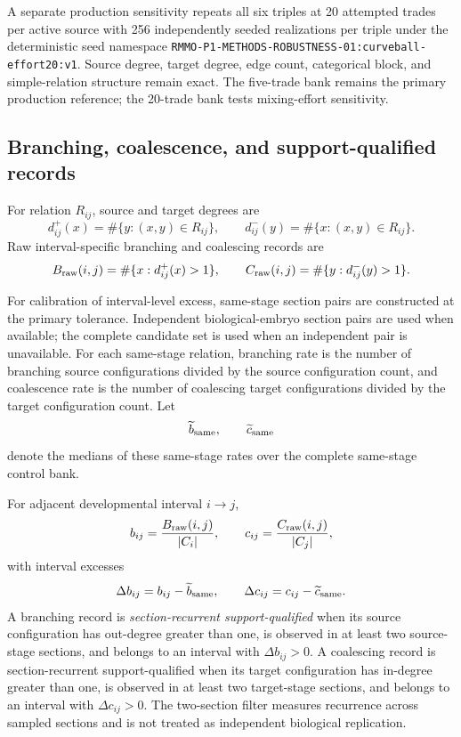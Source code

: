 \documentclass[11pt]{article}
\begin{document}
A separate production sensitivity repeats all six triples at 20 attempted trades per active source with 256 independently seeded realizations per triple under the deterministic seed namespace \texttt{RMMO-P1-METHODS-ROBUSTNESS-01:}\allowbreak\texttt{curveball-effort20:v1}. Source degree, target degree, edge count, categorical block, and simple-relation structure remain exact. The five-trade bank remains the primary production reference; the 20-trade bank tests mixing-effort sensitivity.

\subsection{Branching, coalescence, and support-qualified records}

For relation \(R_{ij}\), source and target degrees are
\[
d_{ij}^{+}(x)
=
\#\{y:(x,y)\in R_{ij}\},
\qquad
d_{ij}^{-}(y)
=
\#\{x:(x,y)\in R_{ij}\}.
\]
Raw interval-specific branching and coalescing records are
\begin{equation}
B_{\rm raw}(i,j)
=
\#\{x:d_{ij}^{+}(x)>1\},
\qquad
C_{\rm raw}(i,j)
=
\#\{y:d_{ij}^{-}(y)>1\}.
\label{eq:rawbranchcoal}
\end{equation}

For calibration of interval-level excess, same-stage section pairs are constructed at the primary tolerance. Independent biological-embryo section pairs are used when available; the complete candidate set is used when an independent pair is unavailable. For each same-stage relation, branching rate is the number of branching source configurations divided by the source configuration count, and coalescence rate is the number of coalescing target configurations divided by the target configuration count. Let
\[
\widetilde b_{\rm same},
\qquad
\widetilde c_{\rm same}
\]
denote the medians of these same-stage rates over the complete same-stage control bank.

For adjacent developmental interval \(i\rightarrow j\),
\[
b_{ij}
=
\frac{B_{\rm raw}(i,j)}{|C_i|},
\qquad
c_{ij}
=
\frac{C_{\rm raw}(i,j)}{|C_j|},
\]
with interval excesses
\[
\Delta b_{ij}
=
b_{ij}-\widetilde b_{\rm same},
\qquad
\Delta c_{ij}
=
c_{ij}-\widetilde c_{\rm same}.
\]
A branching record is \emph{section-recurrent support-qualified} when its source configuration has out-degree greater than one, is observed in at least two source-stage sections, and belongs to an interval with \(\Delta b_{ij}>0\). A coalescing record is section-recurrent support-qualified when its target configuration has in-degree greater than one, is observed in at least two target-stage sections, and belongs to an interval with \(\Delta c_{ij}>0\). The two-section filter measures recurrence across sampled sections and is not treated as independent biological replication.
\end{document}
